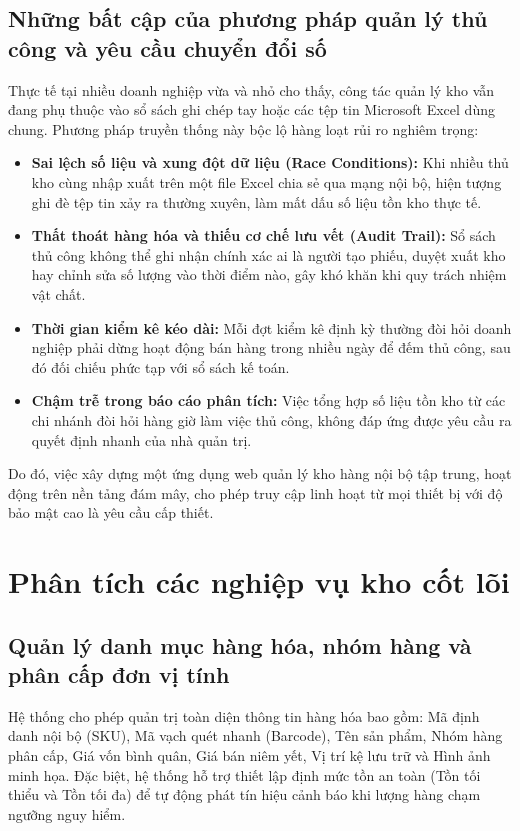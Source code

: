 \documentclass[12pt,a4paper]{report}
\renewcommand{\_}{\textunderscore\allowbreak}
\begin{document}
\subsection{Những bất cập của phương pháp quản lý thủ công và yêu cầu chuyển đổi số}
Thực tế tại nhiều doanh nghiệp vừa và nhỏ cho thấy, công tác quản lý kho vẫn đang phụ thuộc vào sổ sách ghi chép tay hoặc các tệp tin Microsoft Excel dùng chung. Phương pháp truyền thống này bộc lộ hàng loạt rủi ro nghiêm trọng:
\begin{itemize}
    \item \textbf{Sai lệch số liệu và xung đột dữ liệu (Race Conditions):} Khi nhiều thủ kho cùng nhập xuất trên một file Excel chia sẻ qua mạng nội bộ, hiện tượng ghi đè tệp tin xảy ra thường xuyên, làm mất dấu số liệu tồn kho thực tế.
    \item \textbf{Thất thoát hàng hóa và thiếu cơ chế lưu vết (Audit Trail):} Sổ sách thủ công không thể ghi nhận chính xác ai là người tạo phiếu, duyệt xuất kho hay chỉnh sửa số lượng vào thời điểm nào, gây khó khăn khi quy trách nhiệm vật chất.
    \item \textbf{Thời gian kiểm kê kéo dài:} Mỗi đợt kiểm kê định kỳ thường đòi hỏi doanh nghiệp phải dừng hoạt động bán hàng trong nhiều ngày để đếm thủ công, sau đó đối chiếu phức tạp với sổ sách kế toán.
    \item \textbf{Chậm trễ trong báo cáo phân tích:} Việc tổng hợp số liệu tồn kho từ các chi nhánh đòi hỏi hàng giờ làm việc thủ công, không đáp ứng được yêu cầu ra quyết định nhanh của nhà quản trị.
\end{itemize}
Do đó, việc xây dựng một ứng dụng web quản lý kho hàng nội bộ tập trung, hoạt động trên nền tảng đám mây, cho phép truy cập linh hoạt từ mọi thiết bị với độ bảo mật cao là yêu cầu cấp thiết.

\section{Phân tích các nghiệp vụ kho cốt lõi}

\subsection{Quản lý danh mục hàng hóa, nhóm hàng và phân cấp đơn vị tính}
Hệ thống cho phép quản trị toàn diện thông tin hàng hóa bao gồm: Mã định danh nội bộ (SKU), Mã vạch quét nhanh (Barcode), Tên sản phẩm, Nhóm hàng phân cấp, Giá vốn bình quân, Giá bán niêm yết, Vị trí kệ lưu trữ và Hình ảnh minh họa. Đặc biệt, hệ thống hỗ trợ thiết lập định mức tồn an toàn (Tồn tối thiểu và Tồn tối đa) để tự động phát tín hiệu cảnh báo khi lượng hàng chạm ngưỡng nguy hiểm.
\end{document}
